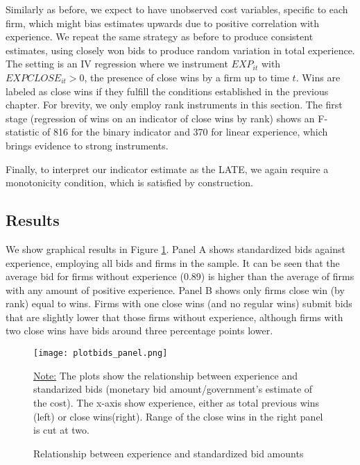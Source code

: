 Similarly as before, we expect to have unobserved cost variables, specific to each firm, which might bias estimates upwards due to positive correlation with experience. We repeat the same strategy as before to produce consistent estimates, using closely won bids to produce random variation in total experience. The setting is an IV regression where we instrument $EXP_{it}$ with $EXPCLOSE_{it}>0$, the presence of close wins by a firm up to time $t$. Wins are labeled as close wins if they fulfill the conditions established in the  previous chapter. For brevity, we only employ rank instruments in this section. The first stage (regression of wins on an indicator of close wins by rank) shows an F-statistic of 816 for the binary indicator and 370 for linear experience, which brings evidence to strong instruments.

Finally, to interpret our indicator estimate as the LATE, we again require a monotonicity condition, which is satisfied by construction.
%
\subsection{Results}
We show graphical results in Figure \ref{fig:plotbids_panel}. Panel A shows standardized bids against experience, employing all bids and firms in the sample. It can be seen that the average bid for firms without experience (0.89) is higher than the average of firms with any amount of positive experience. Panel B shows only firms close win (by rank) equal to wins.  Firms with one close wins (and no regular wins) submit bids that are slightly lower that those firms without experience, although firms with two close wins have bids around three percentage points lower.

\begin{figure}[H]
  \texttt{[image: plotbids\_panel.png]}
  \caption{Relationship between experience and standardized bid amounts}
  \vskip 0.5mm
  { \footnotesize \underline{Note:} The plots show the relationship between experience and standarized bids (monetary bid amount/government's estimate of the cost). The x-axis show experience, either as total previous wins (left) or close wins(right). Range of the close wins in the right panel is cut at two.\par}

  \label{fig:plotbids_panel}
\end{figure}

